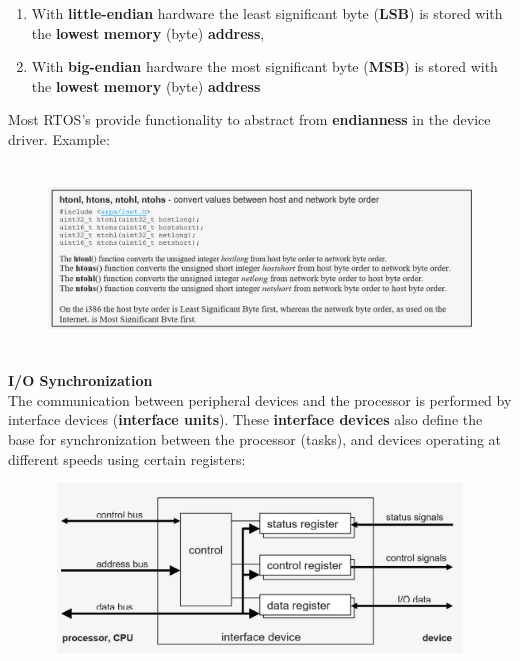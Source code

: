 \begin{enumerate}
\item  With \textbf{little-endian} hardware the least significant byte (\textbf{LSB}) is stored with the \textbf{lowest} \textbf{memory} (byte) \textbf{address}, 

\item  With \textbf{big-endian} hardware the most significant byte (\textbf{MSB}) is stored with the \textbf{lowest} \textbf{memory} (byte) \textbf{address}
\end{enumerate}

Most RTOS's provide functionality to abstract from \textbf{endianness} in the device driver. Example:

 	\begin{figure}[h]
    \centering
    \includegraphics[width=14cm, height=5cm]{Images/image121.png}
    \label{fig:Fig }
    \end{figure}

{\rot\bf I/O Synchronization}\\

The communication between peripheral devices and the processor is performed by interface devices\textbf{ }(\textbf{interface units}). These \textbf{interface devices} also define the base for synchronization between the processor (tasks), and devices operating at different speeds using certain registers:

 	\begin{figure}[h]
    \centering
    \includegraphics[width=12cm, height=4.5cm]{Images/image122.png}
    \label{fig:Fig }
    \end{figure}
\newpage

